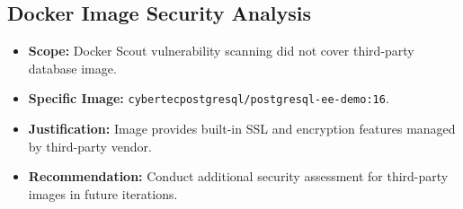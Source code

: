 \documentclass{article}
\begin{document}
\subsection{Docker Image Security Analysis}
\begin{itemize}
    \item \textbf{Scope:} Docker Scout vulnerability scanning did not cover third-party database image.
    \item \textbf{Specific Image:} \texttt{cybertecpostgresql/postgresql-ee-demo:16}.
    \item \textbf{Justification:} Image provides built-in SSL and encryption features managed by third-party vendor.
    \item \textbf{Recommendation:} Conduct additional security assessment for third-party images in future iterations.
\end{itemize}
\end{document}
